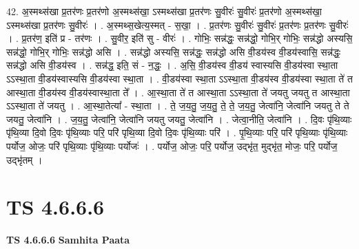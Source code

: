 \documentclass[17pt]{extarticle}
\begin{document}
42. अ॒स्मथ्स॑खा प्र॒तर॑णः प्र॒तर॑णो अ॒स्मथ्स॑खा॒ ऽस्मथ्स॑खा प्र॒तर॑णः सु॒वीरः॑ सु॒वीरः॑ प्र॒तर॑णो अ॒स्मथ्स॑खा॒ ऽस्मथ्स॑खा प्र॒तर॑णः सु॒वीरः॑ । . अ॒स्मथ्स॒खेत्य॒स्मत् - स॒खा॒ । . प्र॒तर॑णः सु॒वीरः॑ सु॒वीरः॑ प्र॒तर॑णः प्र॒तर॑णः सु॒वीरः॑ । . प्र॒तर॑ण॒ इति॑ प्र - तर॑णः । . सु॒वीर॒ इति॑ सु - वीरः॑ । . गोभिः॒ सन्न॑द्धः॒ सन्न॑द्धो॒ गोभि॒र् गोभिः॒ सन्न॑द्धो अस्यसि॒ सन्न॑द्धो॒ गोभि॒र् गोभिः॒ सन्न॑द्धो असि । . सन्न॑द्धो अस्यसि॒ सन्न॑द्धः॒ सन्न॑द्धो असि वी॒डय॑स्व वी॒डय॑स्वासि॒ सन्न॑द्धः॒ सन्न॑द्धो असि वी॒डय॑स्व । . सन्न॑द्ध॒ इति॒ सं - न॒द्धः॒ । . अ॒सि॒ वी॒डय॑स्व वी॒डय॑ स्वास्यसि वी॒डय॑स्वा स्था॒ता ऽऽस्था॒ता वी॒डय॑स्वास्यसि वी॒डय॑स्वा स्था॒ता । . वी॒डय॑स्वा स्था॒ता ऽऽस्था॒ता वी॒डय॑स्व वी॒डय॑स्वा स्था॒ता ते॑ त आस्था॒ता वी॒डय॑स्व वी॒डय॑स्वास्था॒ता ते᳚ । . आ॒स्था॒ता ते॑ त आस्था॒ता ऽऽस्था॒ता ते॑ जयतु जयतु त आस्था॒ता ऽऽस्था॒ता ते॑ जयतु । . आ॒स्था॒तेत्या᳚ - स्था॒ता । . ते॒ ज॒य॒तु॒ ज॒य॒तु॒ ते॒ ते॒ ज॒य॒तु॒ जेत्वा॑नि॒ जेत्वा॑नि जयतु ते ते जयतु॒ जेत्वा॑नि । . ज॒य॒तु॒ जेत्वा॑नि॒ जेत्वा॑नि जयतु जयतु॒ जेत्वा॑नि । . जेत्वा॒नीति॒ जेत्वा॑नि । . दि॒वः पृ॑थि॒व्याः पृ॑थि॒व्या दि॒वो दि॒वः पृ॑थि॒व्याः परि॒ परि॑ पृथि॒व्या दि॒वो दि॒वः पृ॑थि॒व्याः परि॑ । . पृ॒थि॒व्याः परि॒ परि॑ पृथि॒व्याः पृ॑थि॒व्याः पर्योज॒ ओजः॒ परि॑ पृथि॒व्याः पृ॑थि॒व्याः पर्योजः॑ । . पर्योज॒ ओजः॒ परि॒ पर्योज॒ उद्भृ॑त॒ मुद्भृ॑त॒ मोजः॒ परि॒ पर्योज॒ उद्भृ॑तम् । \newline
\pagebreak
{}

\section{ TS 4.6.6.6 }

\textbf{TS 4.6.6.6 } \newline
\textbf{Samhita Paata} \newline
\end{document}
